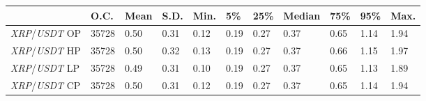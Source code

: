 \begin{tabular}{lllllllllll}
\toprule
 & \textbf{O.C.} & \textbf{Mean} & \textbf{S.D.} & \textbf{Min.} & \textbf{5\%} & \textbf{25\%} & \textbf{Median} & \textbf{75\%} & \textbf{95\%} & \textbf{Max.} \\
\midrule
\emph{XRP}/\emph{USDT} OP & 35728 & 0.50 & 0.31 & 0.12 & 0.19 & 0.27 & 0.37 & 0.65 & 1.14 & 1.94 \\
\emph{XRP}/\emph{USDT} HP & 35728 & 0.50 & 0.32 & 0.13 & 0.19 & 0.27 & 0.37 & 0.66 & 1.15 & 1.97 \\
\emph{XRP}/\emph{USDT} LP & 35728 & 0.49 & 0.31 & 0.10 & 0.19 & 0.27 & 0.37 & 0.65 & 1.13 & 1.89 \\
\emph{XRP}/\emph{USDT} CP & 35728 & 0.50 & 0.31 & 0.12 & 0.19 & 0.27 & 0.37 & 0.65 & 1.14 & 1.94 \\
\bottomrule
\end{tabular}

